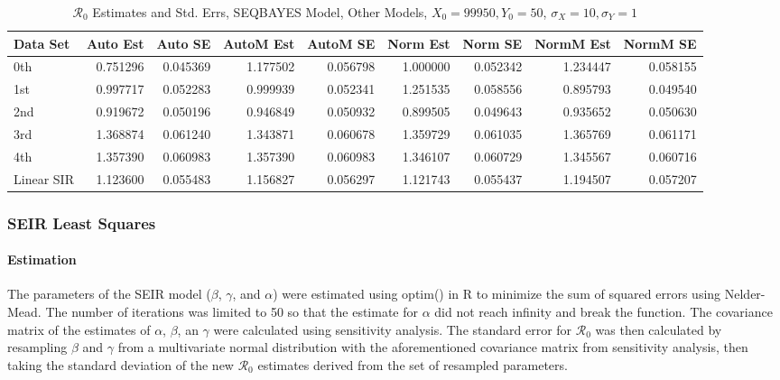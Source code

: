 \documentclass[12pt]{article}
\newcommand{\rr}{\ensuremath{\mathcal{R}_0}}
\begin{document}
\begin{table}[H]
	
	\caption{$\rr$ Estimates and Std. Errs, SEQBAYES Model,
		Other Models, $X_0 = 99950, Y_0 = 50$, 
		$\sigma_X = 10, \sigma_Y = 1$}
	\begin{footnotesize}
		\hskip -1cm
		\begin{tabular}{l|r|r|r|r|r|r|r|r}
			\hline
			Data Set & Auto Est & Auto SE & AutoM Est & AutoM SE & Norm Est & Norm SE & NormM Est & NormM SE\\
			\hline
			0th & 0.751296 & 0.045369 & 1.177502 & 0.056798 & 1.000000 & 0.052342 & 1.234447 & 0.058155\\
			\hline
			1st & 0.997717 & 0.052283 & 0.999939 & 0.052341 & 1.251535 & 0.058556 & 0.895793 & 0.049540\\
			\hline
			2nd & 0.919672 & 0.050196 & 0.946849 & 0.050932 & 0.899505 & 0.049643 & 0.935652 & 0.050630\\
			\hline
			3rd & 1.368874 & 0.061240 & 1.343871 & 0.060678 & 1.359729 & 0.061035 & 1.365769 & 0.061171\\
			\hline
			4th & 1.357390 & 0.060983 & 1.357390 & 0.060983 & 1.346107 & 0.060729 & 1.345567 & 0.060716\\
			\hline
			Linear SIR & 1.123600 & 0.055483 & 1.156827 & 0.056297 & 1.121743 & 0.055437 & 1.194507 & 0.057207\\
			\hline
		\end{tabular}
	\end{footnotesize}
\end{table}

\subsubsection{SEIR Least Squares}

\paragraph{Estimation}

The parameters of the SEIR model ($\beta$, $\gamma$, and $\alpha$) were estimated using optim() in R to minimize the sum of squared errors using Nelder-Mead. The number of iterations was limited to 50 so that the estimate for $\alpha$ did not reach infinity and break the function. The covariance matrix of the estimates of $\alpha$, $\beta$, an $\gamma$ were calculated using sensitivity analysis. The standard error for $\rr$ was then calculated by resampling $\beta$ and $\gamma$ from a multivariate normal distribution with the aforementioned covariance matrix from sensitivity analysis, then taking the standard deviation of the new $\rr$ estimates derived from the set of resampled parameters.
\end{document}
